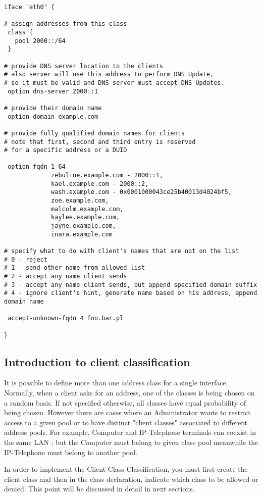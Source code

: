 \begin{enumerate}
\begin{lstlisting}
iface "eth0" {

# assign addresses from this class
 class {
   pool 2000::/64
 }

# provide DNS server location to the clients
# also server will use this address to perform DNS Update,
# so it must be valid and DNS server must accept DNS Updates.
 option dns-server 2000::1

# provide their domain name
 option domain example.com

# provide fully qualified domain names for clients
# note that first, second and third entry is reserved
# for a specific address or a DUID

 option fqdn 1 64
             zebuline.example.com - 2000::1,
             kael.example.com - 2000::2,
             wash.example.com - 0x0001000043ce25b40013d4024bf5,
             zoe.example.com,
             malcolm.example.com,
             kaylee.example.com,
             jayne.example.com,
             inara.example.com

# specify what to do with client's names that are not on the list
# 0 - reject
# 1 - send other name from allowed list
# 2 - accept any name client sends
# 3 - accept any name client sends, but append specified domain suffix
# 4 - ignore client's hint, generate name based on his address, append domain name

 accept-unknown-fqdn 4 foo.bar.pl

}
\end{lstlisting}

\subsection{Introduction to client classification}
\label{feature-client-class}
It is possible to define more than one address class for a single
interface. Normally, when a client asks for an address, one of the
classes is being chosen on a random basis. If not specified otherwise,
all classes have equal probability of being chosen. However there are
cases where an Administrator wants to restrict access to a given pool
or to have distinct "client classes" associated to different address
pools. For example, Computer and IP-Telephone terminals can coexist in
the same LAN ; but the Computer must belong to given class pool
meanwhile the IP-Telephone must belong to another pool.

In order to implement the Client Class Classification, you must first
create the client class and then in the class declaration, indicate
which class to be allowed or denied. This point will be discussed in
detail in next sections.


\end{enumerate}
